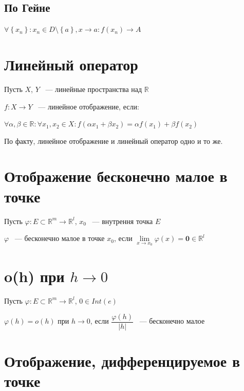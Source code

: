 \documentclass{article}
\begin{document}
        \subsection{По Гейне}
        
            $\forall \left\{ x_n \right\} : x_n \in D \setminus \left\{ a \right\}, x \rightarrow a : f(x_n) \rightarrow A$
            
    \newpage
    
    \section{Линейный оператор}
    
        Пусть $X$, $Y$ ~--- линейные пространства над $\mathbb{R}$
        
        $f: X \rightarrow Y$ ~--- линейное отображение, если:
        
        $\forall \alpha, \beta \in \mathbb{R} : \forall x_1, x_2 \in X : f(\alpha x_1 + \beta x_2) = \alpha f(x_1) + \beta f(x_2)$
        
        По факту, линейное отображение и линейный оператор одно и то же.
        
    \newpage
    
    \section{Отображение бесконечно малое в точке}
    
        Пусть $\varphi : E \subset \mathbb{R}^m \rightarrow \mathbb{R}^l$, $x_0$ ~--- внутрення точка $E$
        
        $\varphi$ ~--- бесконечно малое в точке $x_0$, если $\lim\limits_{x \rightarrow x_0} \varphi(x) = \mathbf{0} \in \mathbb{R}^l$
        
    \newpage
    
    \section{o(h) при $h \rightarrow 0$}
    
        Пусть $\varphi : E \subset \mathbb{R}^m \rightarrow \mathbb{R}^l$, $0 \in Int(e)$
        
        $\varphi(h) = o(h)$ при $h \rightarrow 0$, если $\dfrac{\varphi(h)}{| h |}$ ~--- бесконечно малое
        
    \newpage
    
    \section{Отображение, дифференцируемое в точке}
    
\end{document}
